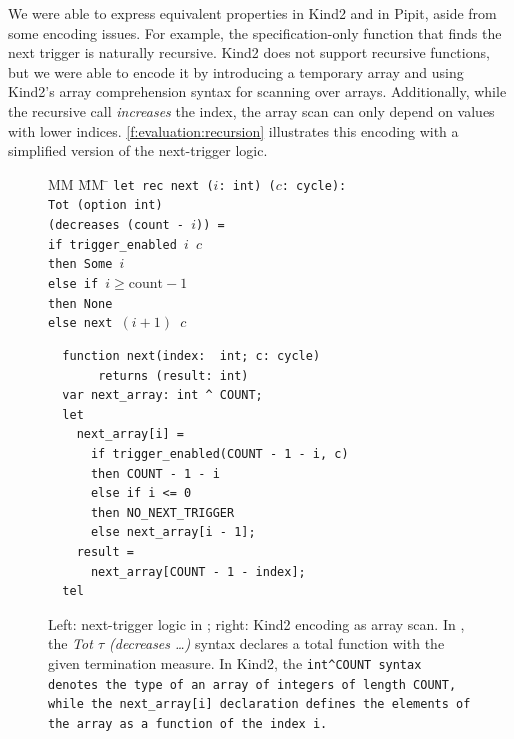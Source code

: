 \documentclass[a4paper,UKenglish,cleveref, autoref, thm-restate,anonymous]{lipics-v2021}
\begin{document}
We were able to express equivalent properties in Kind2 and in Pipit, aside from some encoding issues.
For example, the specification-only function that finds the next trigger is naturally recursive.
Kind2 does not support recursive functions, but we were able to encode it by introducing a temporary array and using Kind2's array comprehension syntax for scanning over arrays.
Additionally, while the recursive call \emph{increases} the index, the array scan can only depend on values with lower indices.
\autoref{f:evaluation:recursion} illustrates this encoding with a simplified version of the next-trigger logic.

\begin{figure}
\begin{minipage}{0.45\textwidth}
\begin{tabbing}
  MM \= MM \= \kill
\tt{let rec} next ($i$: int) ($c$: cycle): \\
  \> Tot \> (option int) \\
  \>     \> (decreases (count - $i$)) = \\
\>  \tt{if} trigger_enabled $i$~$c$ \\
\>  \tt{then} Some $i$ \\
\>  \tt{else if} $i \ge \text{count} - 1$ \\
\>  \tt{then} None \\
\>  \tt{else} next $(i + 1)$~$c$
\end{tabbing}
\end{minipage}
\begin{minipage}{0.55\textwidth}
\begin{verbatim}
  function next(index:  int; c: cycle)
       returns (result: int)
  var next_array: int ^ COUNT;
  let
    next_array[i] =
      if trigger_enabled(COUNT - 1 - i, c)
      then COUNT - 1 - i
      else if i <= 0
      then NO_NEXT_TRIGGER
      else next_array[i - 1];
    result =
      next_array[COUNT - 1 - index];
  tel
\end{verbatim}
\end{minipage}
\caption{Left: next-trigger logic in \fstar{}; right: Kind2 encoding as array scan. In \fstar{}, the \emph{Tot $\tau$ (decreases \ldots)} syntax declares a total function with the given termination measure.
In Kind2, the \tt{int\^{}COUNT} syntax denotes the type of an array of integers of length \tt{COUNT}, while the \tt{next_array[i]} declaration defines the elements of the array as a function of the index \tt{i}.
}
\label{f:evaluation:recursion}
\end{figure}
\end{document}
